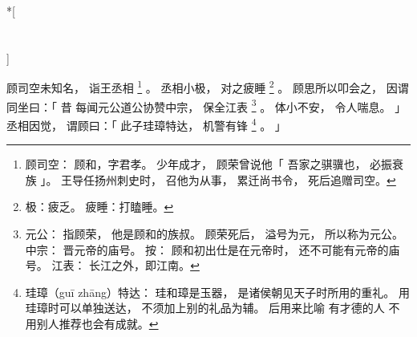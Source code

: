 
\switchcolumn[0]*[\section{}]

顾司空未知名，
诣王丞相%
\footnote{%
    顾司空：
        顾和，字君孝。
        少年成才，
        顾荣曾说他「
            吾家之骐骥也，
            必振衰族
        」。
        王导任扬州刺史时，
        召他为从事，
        累迁尚书令，
        死后追赠司空。
}%
。
丞相小极，
对之疲睡%
\footnote{%
    极：疲乏。
    疲睡：打瞌睡。
}%
。
顾思所以叩会之，
因谓同坐曰：「
    昔
    每闻元公道公协赞中宗，
    保全江表%
    \footnote{%
        元公：
            指顾荣，
            他是顾和的族叔。
            顾荣死后，
            溢号为元，
            所以称为元公。
        中宗：
            晋元帝的庙号。
            按：
            顾和初出仕是在元帝时，
            还不可能有元帝的庙号。
        江表：
            长江之外，即江南。
    }%
    。
    体小不安，
    令人喘息。
」
丞相因觉，
谓顾曰：「
    此子珪璋特达，
    机警有锋%
    \footnote{%
        珪璋（guī zhāng）特达：
            珪和璋是玉器，
            是诸侯朝见天子时所用的重礼。
            用珪璋时可以单独送达，
            不须加上别的礼品为辅。
            后用来比喻
            有才德的人
            不用别人推荐也会有成就。
    }%
    。
」

\switchcolumn




